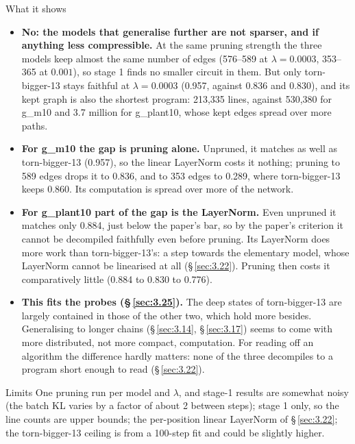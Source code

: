\documentclass[paper=a4,fontsize=11pt,DIV=11,parskip=half,headings=small,numbers=noendperiod]{scrartcl}
\DeclareRobustCommand{\lead}[1]{\textsf{\bfseries\color{accent}#1}}
\DeclareRobustCommand{\code}[1]{{\fontseries{m}\ttfamily #1}}
\begin{document}
\begin{findbox}{What it shows}
\begin{itemize}
\item \lead{No: the models that generalise further are not sparser, and if anything less compressible.} At the
  same pruning strength the three models keep almost the same number of edges (576–589 at $\lambda=0.0003$,
  353–365 at $0.001$), so stage 1 finds no smaller circuit in them. But only
  \code{torn-\allowbreak{}bigger-\allowbreak{}13} stays faithful at $\lambda=0.0003$ (0.957, against 0.836 and
  0.830), and its kept graph is also the shortest program: 213,335 lines, against 530,380 for
  \code{g\_\allowbreak{}m10} and 3.7 million for \code{g\_\allowbreak{}plant10}, whose kept edges spread over
  more paths.
\item \lead{For \code{g\_\allowbreak{}m10} the gap is pruning alone.} Unpruned, it matches as well as
  \code{torn-\allowbreak{}bigger-\allowbreak{}13} (0.957), so the linear LayerNorm costs it nothing; pruning to
  589 edges drops it to 0.836, and to 353 edges to 0.289, where \code{torn-\allowbreak{}bigger-\allowbreak{}13}
  keeps 0.860. Its computation is spread over more of the network.
\item \lead{For \code{g\_\allowbreak{}plant10} part of the gap is the LayerNorm.} Even unpruned it matches only
  0.884, just below the paper’s bar, so by the paper’s criterion it cannot be decompiled faithfully even before
  pruning. Its LayerNorm does more work than \code{torn-\allowbreak{}bigger-\allowbreak{}13}’s: a step towards
  the elementary model, whose LayerNorm cannot be linearised at all (\S\,\ref{sec:3.22}). Pruning then costs it
  comparatively little (0.884 to 0.830 to 0.776).
\item \lead{This fits the probes (\S\,\ref{sec:3.25}).} The deep states of
  \code{torn-\allowbreak{}bigger-\allowbreak{}13} are largely contained in those of the other two, which hold
  more besides. Generalising to longer chains (\S\,\ref{sec:3.14}, \S\,\ref{sec:3.17}) seems to come with more
  distributed, not more compact, computation. For reading off an algorithm the difference hardly matters: none
  of the three decompiles to a program short enough to read (\S\,\ref{sec:3.22}).
\end{itemize}
\end{findbox}

\begin{limbox}{Limits}
One pruning run per model and $\lambda$, and stage-1 results are somewhat noisy (the batch KL varies by a factor
of about 2 between steps); stage 1 only, so the line counts are upper bounds; the per-position linear LayerNorm
of \S\,\ref{sec:3.22}; the \code{torn-\allowbreak{}bigger-\allowbreak{}13} ceiling is from a 100-step fit and
could be slightly higher.
\end{limbox}
\end{document}
